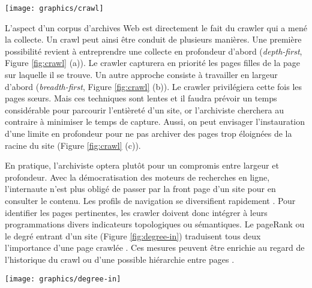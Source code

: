 \documentclass[symmetric,justified,marginals=raggedouter]{tufte-book}
\begin{document}
\begin{figure*}%
  \texttt{[image: graphics/crawl]}
  \caption{Différentes stratégies adoptées par un crawler $c$ pour collecter les pages $\{p_1,...p_n\}$ d'un même site}
  \label{fig:crawl}
\end{figure*}

\noindent L'aspect d'un corpus d'archives Web est directement le fait du crawler qui a mené la collecte. Un crawl peut ainsi être conduit de plusieurs manières. Une première possibilité revient à entreprendre une collecte en profondeur d'abord (\textit{depth-first}, Figure \ref{fig:crawl} (a)). Le crawler capturera en priorité les pages filles de la page sur laquelle il se trouve. Un autre approche consiste à travailler en largeur d'abord (\textit{breadth-first}, Figure \ref{fig:crawl} (b)). Le crawler privilégiera cette fois les pages sœurs. Mais ces techniques sont lentes et il faudra prévoir un temps considérable pour parcourir l'entièreté d'un site, or l'archiviste cherchera au contraire à minimiser le temps de capture. Aussi, on peut envisager l'instauration d'une limite en profondeur pour ne pas archiver des pages trop éloignées de la racine du site (Figure \ref{fig:crawl} (c)).

En pratique, l'archiviste optera plutôt pour un compromis entre largeur et profondeur. Avec la démocratisation des moteurs de re\-cherches en ligne, l'internaute n'est plus obligé de passer par la front page d'un site pour en consulter le contenu. Les profils de navigation se diversifient rapidement \citep{holscher_web_2000}. Pour identifier les pages pertinentes, les crawler doivent donc intégrer à leurs programmations divers indicateurs topologiques ou sémantiques. Le pageRank \citep{page_pagerank_1999} ou le degré entrant d'un site (Figure \ref{fig:degree-in}) traduisent tous deux l'importance d'une page crawlée \citep{cho_efficient_1998}. Ces mesures peuvent être enrichie au regard de l'historique du crawl ou d'une possible hiérarchie entre pages \citep{baeza-yates_crawling_2005}. 

\begin{marginfigure}%
  \texttt{[image: graphics/degree-in]}
  \caption{Graphe dont les nœuds sont labellisés par degré entrant. En théorie des graphes, le degré $deg^-(v)$ d'un nœud $v$ correspond au nombre de liens incidents entrant à ce nœud.}
  \label{fig:degree-in}
\end{marginfigure} 
\end{document}
